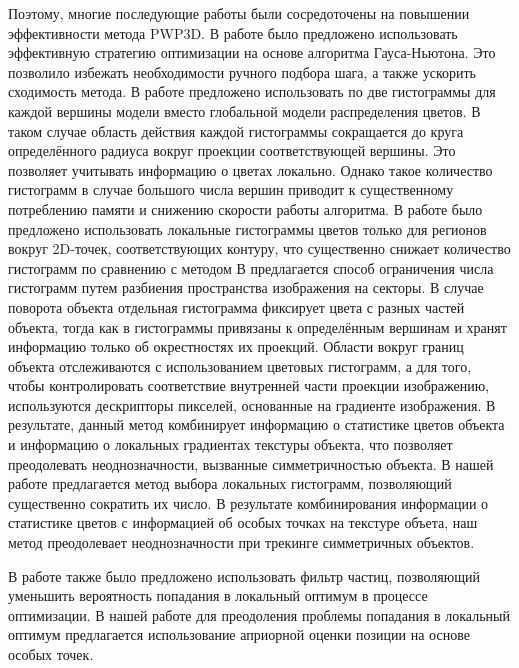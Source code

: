 Поэтому, многие последующие работы были сосредоточены на повышении эффективности
метода PWP3D. В работе \cite{Tjaden2018} было предложено использовать
эффективную стратегию оптимизации на основе алгоритма Гауса-Ньютона. Это
позволило избежать необходимости ручного
подбора шага, а также ускорить сходимость метода. В работе \cite{Tjaden2017}
предложено использовать по две гистограммы для каждой вершины модели вместо
глобальной модели распределения цветов. В таком случае область действия каждой
гистограммы сокращается до круга определённого радиуса вокруг проекции
соответствующей вершины. Это позволяет учитывать информацию о цветах локально.
Однако такое количество гистограмм в случае большого числа вершин приводит к
существенному потреблению памяти и снижению скорости работы алгоритма.
В работе \cite{Hexner2016} было предложено использовать локальные гистограммы
цветов только для регионов вокруг 2D-точек, соответствующих контуру, что
существенно снижает количество гистограмм по сравнению с методом
\cite{Tjaden2017}
В \cite{RegionPhotometric} предлагается способ ограничения числа гистограмм
путем разбиения пространства изображения на секторы. В случае поворота объекта
отдельная гистограмма фиксирует цвета с разных частей
объекта, тогда как в \cite{Tjaden2017} гистограммы привязаны к определённым
вершинам и хранят информацию только об окрестностях их проекций.
Области вокруг границ объекта отслеживаются с использованием цветовых
гистограмм, а для того, чтобы контролировать соответствие внутренней части
проекции изображению, используются дескрипторы пикселей, основанные на
градиенте изображения. В результате, данный метод комбинирует информацию о
статистике цветов объекта и информацию о локальных градиентах текстуры объекта,
что позволяет преодолевать неоднозначности, вызванные симметричностью объекта.
В нашей работе предлагается метод выбора локальных гистограмм, позволяющий
существенно сократить их число. 
В результате комбинирования информации о статистике цветов с информацией об
особых точках на текстуре объета, наш метод преодолевает неоднозначности при
трекинге симметричных объектов.

В работе \cite{Zhao2014} также было предложено использовать фильтр частиц,
позволяющий уменьшить вероятность попадания в локальный оптимум в процессе
оптимизации. В нашей работе для преодоления проблемы попадания в локальный
оптимум предлагается использование априорной оценки позиции на основе особых
точек.
